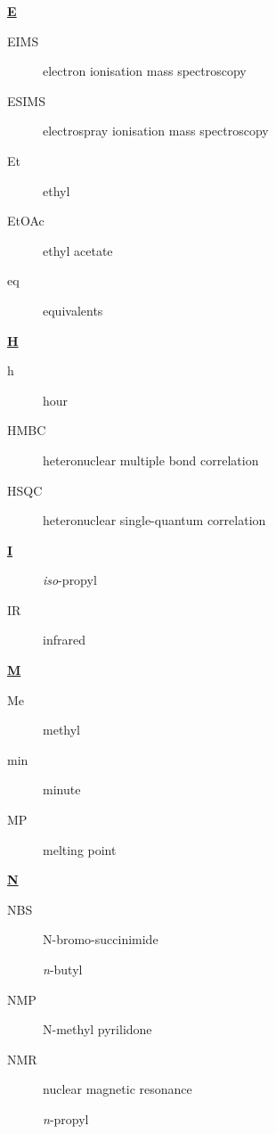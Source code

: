 \begin{multicols}{2}
{\begin{center}
\textbf{\underline{E}}
\end{center}
\begin{description}
\item[EIMS]   electron ionisation mass spectroscopy 
\item[ESIMS]  electrospray ionisation mass spectroscopy 
\item[Et]   ethyl 
\item[EtOAc] ethyl acetate
\item[eq]   equivalents 
\end{description}

\begin{center}
\textbf{\underline{H}}
\end{center}
\begin{description}
\item[h]   hour 
\item[HMBC]  heteronuclear multiple bond correlation 
\item[HSQC]   heteronuclear single-quantum correlation 
\end{description}

\begin{center}
\textbf{\underline{I}}
\end{center}
\begin{description}
\item[\iPr]   \textit{iso}-propyl 
\item[IR]   infrared 
\end{description}

\begin{center}
\textbf{\underline{M}}
\end{center}
\begin{description}
\item[Me]   methyl 
\item[min]   minute 
\item[MP]   melting point  
\end{description}

\begin{center}
\textbf{\underline{N}}
\end{center}
\begin{description}
\item[NBS] N-bromo-succinimide
\item[\nBu]  \textit{n}-butyl
\item[NMP]  N-methyl pyrilidone
\item[NMR]   nuclear magnetic resonance 
\item[\nPr]  \textit{n}-propyl
\end{description}

}
\end{multicols}
